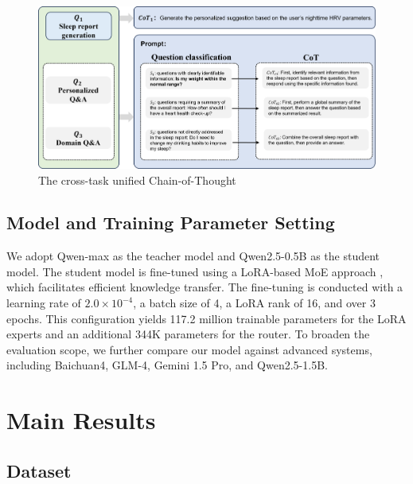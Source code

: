 \documentclass[preprint,12pt]{elsarticle}
\begin{document}
\begin{figure}[h]
\centerline{\includegraphics[width=\columnwidth]{cot.png}}
\caption{The cross-task unified Chain-of-Thought }
\label{fig_cot}
\end{figure}

\subsection{Model and Training Parameter Setting}
We adopt Qwen-max as the teacher model and Qwen2.5-0.5B as the student model. The student model is fine-tuned using a LoRA-based MoE approach \cite{hu2021LoRA}, which facilitates efficient knowledge transfer. The fine-tuning is conducted with a learning rate of \(2.0 \times 10^{-4}\), a batch size of 4, a LoRA rank of 16, and over 3 epochs. This configuration yields 117.2 million trainable parameters for the LoRA experts and an additional 344K parameters for the router. To broaden the evaluation scope, we further compare our model against advanced systems, including Baichuan4, GLM-4, Gemini 1.5 Pro, and Qwen2.5-1.5B.

\section{Main Results}
\subsection{Dataset}
\end{document}
